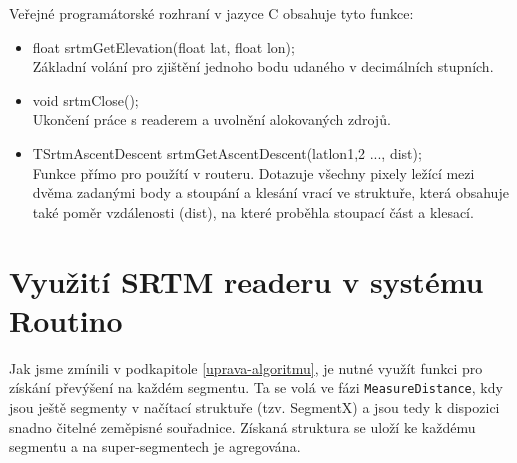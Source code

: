 \documentclass[thesis=B,czech]{FITthesis}[2012/06/26]
\begin{document}
Veřejné programátorské rozhraní v jazyce C obsahuje tyto funkce:
\begin{itemize}

\item{float srtmGetElevation(float lat, float lon); \\
Základní volání pro zjištění jednoho bodu udaného v decimálních stupních.}

\item{void srtmClose(); \\
Ukončení práce s readerem a uvolnění alokovaných zdrojů.}

\item{TSrtmAscentDescent srtmGetAscentDescent(latlon1,2 ..., dist); \\ 
 Funkce přímo pro použítí v routeru. Dotazuje všechny pixely ležící mezi dvěma zadanými body a stoupání a klesání vrací ve struktuře, která obsahuje také poměr vzdálenosti (dist), na které proběhla stoupací část a klesací.
 }

\end{itemize}



\section{Využití SRTM readeru v systému Routino}

Jak jsme zmínili v podkapitole \ref{uprava-algoritmu}, je nutné využít funkci pro získání převýšení na každém segmentu. Ta se volá ve fázi \verb|MeasureDistance|, kdy jsou ještě segmenty v načítací struktuře (tzv. SegmentX) a jsou tedy k dispozici snadno čitelné zeměpisné souřadnice. Získaná struktura se uloží ke každému segmentu a na super-segmentech je agregována.





















\end{document}
